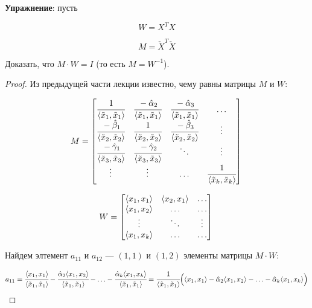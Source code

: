 \documentclass[12pt]{article} %
\theoremstyle{definition} %
\begin{document}
\textbf{Упражнение}: пусть 

\[
W = X^T X
\]

\[
M = \check X^T \check X
\]

Доказать, что $ M \cdot W = I $ (то есть $M = W^{-1}$).

\begin{proof} \hspace{1cm} \par

Из предыдущей части лекции известно, чему равны матрицы $M$ и $W$:

\[
    M =
    \begin{bmatrix}
       \cfrac{1}{\langle \tilde x_1,\tilde x_1 \rangle} &
       \cfrac{-\hat \alpha_2 }{\langle \tilde x_1,\tilde x_1 \rangle} &
       \cfrac{-\hat \alpha_3 }{\langle \tilde x_1,\tilde x_1 \rangle} & \ldots \\
     \cfrac{-\hat\beta_1}{\langle \tilde x_2,\tilde x_2 \rangle} & \cfrac{1}{\langle \tilde x_2,\tilde x_2 \rangle} & \cfrac{-\hat\beta_3}{\langle \tilde x_2,\tilde x_2 \rangle}  & \vdots \\
        \cfrac{-\hat\gamma_1}{\langle \tilde x_3,\tilde x_3 \rangle} & \cfrac{-\hat\gamma_2}{\langle \tilde x_3,\tilde x_3 \rangle} & \ddots & \vdots \\
        \vdots & \vdots & \ldots & \cfrac{1}{\langle \tilde x_k,\tilde x_k \rangle} \\
     \end{bmatrix} \\
 \]

 \[   
     W=
     \begin{bmatrix}
       \langle x_1, x_1 \rangle & \langle x_2, x_1 \rangle & \ldots \\
       \langle x_1, x_2 \rangle & \ldots & \ldots \\
       \vdots & \ddots & \vdots \\
       \langle x_1, x_k \rangle & \ldots & \ldots \\
     \end{bmatrix} \\
\]

Найдем элтемент $a_{11}$ и $a_{12}$  —  $(1,1)$ и $(1,2)$ элементы матрицы $ M \cdot W $:

\[  
    a_{11} = 
    \cfrac{\langle x_1, x_1 \rangle}{\langle\tilde x_1,\tilde x_1 \rangle} -
    \cfrac{\hat \alpha_2 \langle x_1, x_2 \rangle}{\langle\tilde x_1,\tilde x_1 \rangle} - \ldots 
     - \cfrac{\hat \alpha_k \langle x_1, x_k \rangle}{\langle\tilde x_1,\tilde x_1 \rangle}
    =\\
    \cfrac{1}{\langle\tilde x_1,\tilde x_1 \rangle} \Big ( \langle x_1, x_1 \rangle - \hat \alpha_2  \langle x_1, x_2 \rangle - \ldots 
    - \hat \alpha_k  \langle x_1, x_k \rangle   \Big )     
\]


\end{proof}
\end{document}
